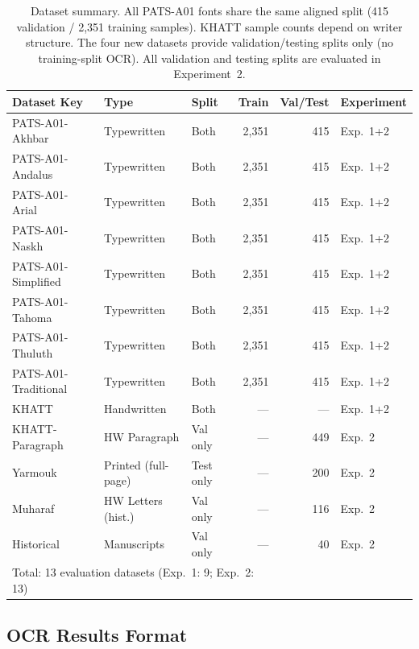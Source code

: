 \begin{table}[ht]
\caption{Dataset summary. All PATS-A01 fonts share the same aligned split
         (415 validation / 2,351 training samples). KHATT sample counts
         depend on writer structure. The four new datasets provide
         validation/testing splits only (no training-split OCR). All
         validation and testing splits are evaluated in Experiment~2.}
\label{tab:datasets}
\centering
\renewcommand{\arraystretch}{1.3}
\begin{tabularx}{\linewidth}{lllrrl}
\toprule
\textbf{Dataset Key} & \textbf{Type} & \textbf{Split} & \textbf{Train} & \textbf{Val/Test} & \textbf{Experiment} \\
\midrule
PATS-A01-Akhbar       & Typewritten & Both & 2,351 & 415 & Exp.~1+2 \\
PATS-A01-Andalus      & Typewritten & Both & 2,351 & 415 & Exp.~1+2 \\
PATS-A01-Arial        & Typewritten & Both & 2,351 & 415 & Exp.~1+2 \\
PATS-A01-Naskh        & Typewritten & Both & 2,351 & 415 & Exp.~1+2 \\
PATS-A01-Simplified   & Typewritten & Both & 2,351 & 415 & Exp.~1+2 \\
PATS-A01-Tahoma       & Typewritten & Both & 2,351 & 415 & Exp.~1+2 \\
PATS-A01-Thuluth      & Typewritten & Both & 2,351 & 415 & Exp.~1+2 \\
PATS-A01-Traditional  & Typewritten & Both & 2,351 & 415 & Exp.~1+2 \\
KHATT                 & Handwritten & Both & ---   & --- & Exp.~1+2 \\
\midrule
KHATT-Paragraph       & HW Paragraph & Val only & --- & 449 & Exp.~2 \\
Yarmouk               & Printed (full-page) & Test only & --- & 200 & Exp.~2 \\
Muharaf               & HW Letters (hist.) & Val only & --- & 116 & Exp.~2 \\
Historical            & Manuscripts & Val only & --- & 40 & Exp.~2 \\
\midrule
\multicolumn{4}{l}{\footnotesize Total: 13 evaluation datasets (Exp.~1: 9; Exp.~2: 13)} & & \\
\bottomrule
\end{tabularx}
\end{table}

\subsection{OCR Results Format}
\label{subsec:ocr_format}

